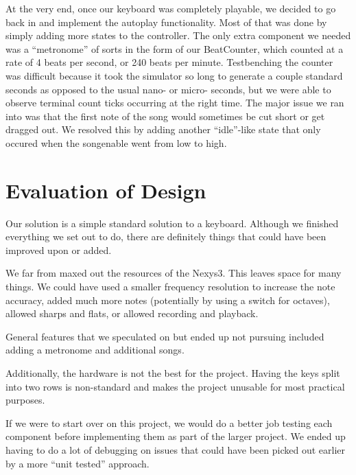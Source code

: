 \documentclass{article}
\begin{document}
    At the very end, once our keyboard was completely playable, we decided to go back in and implement the autoplay functionality. Most of that was done by simply adding more states to the controller. The only extra component we needed was a ``metronome'' of sorts in the form of our BeatCounter, which counted at a rate of 4 beats per second, or 240 beats per minute. Testbenching the counter was difficult because it took the simulator so long to generate a couple standard seconds as opposed to the usual nano- or micro- seconds, but we were able to observe terminal count ticks occurring at the right time. The major issue we ran into was that the first note of the song would sometimes be cut short or get dragged out. We resolved this by adding another ``idle''-like state that only occured when the song\textunderscore enable went from low to high. 

\section{Evaluation of Design}
  

  Our solution is a simple standard solution to a keyboard. Although we finished everything we set out to do, there are definitely things that could have been improved upon or added.

  We far from maxed out the resources of the Nexys3. This leaves space for many things. We could have used a smaller frequency resolution to increase the note accuracy, added much more notes (potentially by using a switch for octaves), allowed sharps and flats, or allowed recording and playback.

  General features that we speculated on but ended up not pursuing included adding a metronome and additional songs.

  Additionally, the hardware is not the best for the project. Having the keys split into two rows is non-standard and makes the project unusable for most practical purposes.

  If we were to start over on this project, we would do a better job testing each component before implementing them as part of the larger project. We ended up having to do a lot of debugging on issues that could have been picked out earlier by a more ``unit tested'' approach.
\end{document}
